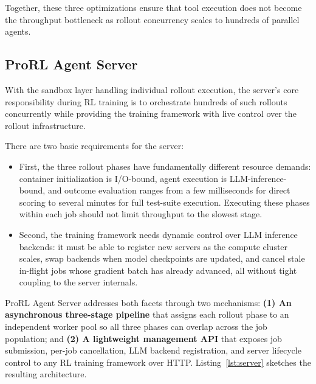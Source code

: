 Together, these three optimizations ensure that tool execution does not become the throughput bottleneck as rollout concurrency scales to hundreds of parallel agents.

\subsection{ProRL Agent Server}
\label{sec:server}

With the sandbox layer handling individual rollout execution, the server's
core responsibility during RL training is to orchestrate hundreds of such
rollouts concurrently while providing the training framework with live control
over the rollout infrastructure.

There are two basic requirements for the server:
\begin{itemize}
    \item First, the three rollout phases have fundamentally different resource demands: container initialization is I/O-bound, agent execution is LLM-inference-bound, and outcome evaluation ranges from a few milliseconds for direct scoring to several minutes for full test-suite execution. Executing these phases within each job should not limit throughput to the slowest stage.
    \item Second, the training framework needs dynamic control over LLM inference backends: it must be able to register new servers as the compute cluster scales, swap backends when model checkpoints are updated, and cancel stale in-flight jobs whose gradient batch has already advanced, all without tight coupling to the server internals. 
\end{itemize}

ProRL Agent Server addresses both facets through two mechanisms: 
\textbf{(1) An asynchronous three-stage pipeline} that assigns each rollout phase to an independent worker pool so all three phases can overlap across the job population; and 
\textbf{(2) A lightweight management API} that exposes job submission, per-job cancellation, LLM backend registration, and server lifecycle control to any RL training framework over HTTP.
Listing~\ref{lst:server} sketches the resulting architecture.

